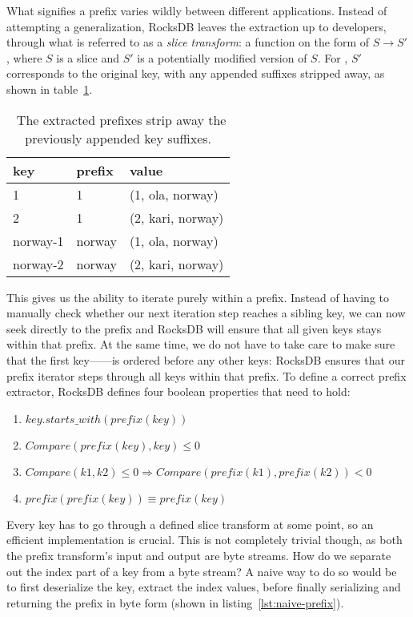 What signifies a prefix varies wildly between different applications. Instead of
attempting a generalization, RocksDB leaves the extraction up to developers,
through what is referred to as a \textit{slice transform}: a function on the
form of $ S \rightarrow S' $, where $ S $ is a slice and $ S' $ is a potentially
modified version of $ S $. For , $ S' $ corresponds to the
original key, with any appended suffixes stripped away, as shown in
table~\ref{table:prefix}.

\begin{table}[H]
  \centering
  \begin{tabular}{l l l}
    \toprule
    \textbf{key} & \textbf{prefix} & \textbf{value} \\ \midrule
    1 & 1 & (1, ola, norway) \\ \midrule
    2 & 1 & (2, kari, norway) \\ \midrule
    norway-1 & norway & (1, ola, norway) \\ \midrule
    norway-2 & norway & (2, kari, norway) \\ \midrule
  \end{tabular}

  \caption{\
    The extracted prefixes strip away the previously appended key suffixes.
  }\label{table:prefix}
\end{table}

This gives us the ability to iterate purely within a prefix. Instead of having
to manually check whether our next iteration step reaches a sibling key, we can
now seek directly to the prefix and RocksDB will ensure that all given keys
stays within that prefix. At the same time, we do not have to take care to make
sure that the first key---\eg \code{norway-1}---is ordered before any other
keys: RocksDB ensures that our prefix iterator steps through all keys within
that prefix. To define a correct prefix extractor, RocksDB defines four
boolean properties that need to hold:

\begin{enumerate}
  \item $ key.starts\_with(prefix(key)) $
  \item $ Compare(prefix(key), key) \leq 0 $
  \item $ Compare(k1, k2) \leq 0 \Longrightarrow Compare(prefix(k1), prefix(k2)) < 0 $
  \item $ prefix(prefix(key)) \equiv prefix(key) $
\end{enumerate}

Every key has to go through a defined slice transform at some point, so an
efficient implementation is crucial. This is not completely trivial though, as
both the prefix transform's input and output are byte streams. How do we
separate out the index part of a key from a byte stream? A naive way to do so
would be to first deserialize the key, extract the index values, before finally
serializing and returning the prefix in byte form (shown in
listing~\ref{lst:naive-prefix}).

